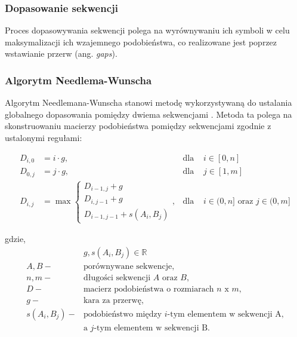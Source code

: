         \subsubsection{Dopasowanie sekwencji}
        
            Proces dopasowywania sekwencji polega na wyrównywaniu ich symboli w celu maksymalizacji ich wzajemnego podobieństwa, co realizowane jest poprzez wstawianie przerw (ang. \textit{gaps}).
            
        \subsubsection{Algorytm Needlema-Wunscha}
        
           Algorytm Needlemana-Wunscha stanowi metodę wykorzystywaną do ustalania globalnego dopasowania pomiędzy dwiema sekwencjami \cite{NeedlemanWunsch1970}. Metoda ta polega na skonstruowaniu macierzy podobieństwa pomiędzy sekwencjami zgodnie z ustalonymi regułami:

           \begin{equation}
                \begin{aligned}
                    D_{i,0} &= i \cdot g, & \text{dla } & i \in [0, n] \\
                    D_{0,j} &= j \cdot g, & \text{dla } & j \in [1, m] \\
                    D_{i,j} &= \max
                    \begin{cases}
                    D_{i - 1, j} + g \\
                    D_{i, j - 1} + g \\
                    D_{i - 1, j - 1} + s(A_i, B_j)
                    \end{cases}, & \text{dla } & i \in (0, n] \text{ oraz } j \in (0, m]
                \end{aligned}
            \end{equation}

            gdzie,
            \begin{align*} 
                & g, s(A_i, B_j) \in \mathbb{R} \\
                A, B -& \text{porównywane sekwencje}, \\
                n, m -& \text{długości sekwencji } A \text{ oraz } B, \\
                D -& \text{macierz podobieństwa o rozmiarach } n \text{ x } m, \\
                g -& \text{kara za przerwę}, \\
                s(A_i, B_j) -& \text{podobieństwo między  } i\text{-tym elementem w sekwencji A,} \\ 
                & \text{a } j \text{-tym elementem w sekwencji B}. \\
            \end{align*}

